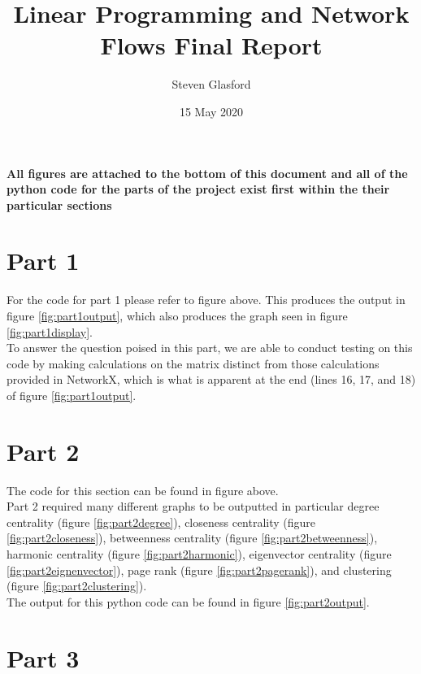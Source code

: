 \documentclass{article}
\title{Linear Programming and Network Flows Final Report}
\author{Steven Glasford}
\date{15 May 2020}
\begin{document}
\maketitle
\begin{center}
    \textbf{All figures are attached to the bottom of this document and all of the python code for the parts of the project exist first within the their particular sections}
\end{center}
\section{Part 1}

For the code for part 1 please refer to figure above. This produces the output in figure \ref{fig:part1output}, which also produces the graph seen in figure \ref{fig:part1display}. \\
To answer the question poised in this part, we are able to conduct testing on this code by making calculations on the matrix distinct from those calculations provided in NetworkX, which is what is apparent at the end (lines 16, 17, and 18) of figure \ref{fig:part1output}.



\section{Part 2}

The code for this section can be found in figure above.
\\Part 2 required many different graphs to be outputted in particular degree centrality (figure \ref{fig:part2degree}), closeness centrality (figure \ref{fig:part2closeness}), betweenness centrality (figure \ref{fig:part2betweenness}), harmonic centrality (figure \ref{fig:part2harmonic}), eigenvector centrality (figure \ref{fig:part2eignenvector}), page rank (figure \ref{fig:part2pagerank}), and clustering (figure \ref{fig:part2clustering}). 
\\The output for this python code can be found in figure \ref{fig:part2output}.

\section{Part 3}

\end{document}

